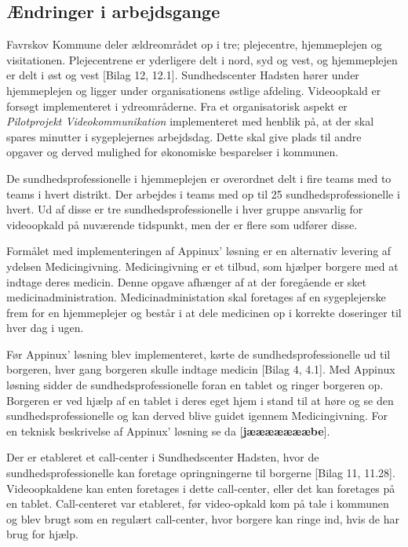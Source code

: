 \subsection{Ændringer i arbejdsgange}
Favrskov Kommune deler ældreområdet op i tre; plejecentre, hjemmeplejen og visitationen. Plejecentrene er yderligere delt i nord, syd og vest, og hjemmeplejen er delt i øst og vest [Bilag 12, 12.1]. Sundhedscenter Hadsten hører under hjemmeplejen og ligger under organisationens østlige afdeling. Videoopkald er forsøgt implementeret i ydreområderne. Fra et organisatorisk aspekt er \textit{Pilotprojekt Videokommunikation} implementeret med henblik på, at der skal spares minutter i sygeplejernes arbejdsdag. Dette skal give plads til andre opgaver og derved mulighed for økonomiske besparelser i kommunen. 

De sundhedsprofessionelle i hjemmeplejen er overordnet delt i fire teams med to teams i hvert distrikt. Der arbejdes i teams med op til 25 sundhedsprofessionelle i hvert. Ud af disse er tre sundhedsprofessionelle i hver gruppe ansvarlig for videoopkald på nuværende tidspunkt, men der er flere som udfører disse.  

Formålet med implementeringen af Appinux’ løsning er en alternativ levering af ydelsen Medicingivning. Medicingivning er et tilbud, som hjælper borgere med at indtage deres medicin. Denne opgave afhænger af at der foregående er sket medicinadministration. Medicinadministation skal foretages af en sygeplejerske frem for en hjemmeplejer og består i at dele medicinen op i korrekte doseringer til hver dag i ugen.

Før Appinux’ løsning blev implementeret, kørte de sundhedsprofessionelle ud til borgeren, hver gang borgeren skulle indtage medicin [Bilag 4, 4.1]. Med Appinux løsning sidder de sundhedsprofessionelle foran en tablet og ringer borgeren op. Borgeren er ved hjælp af en tablet i deres eget hjem i stand til at høre og se den sundhedsprofessionelle og kan derved blive guidet igennem Medicingivning. For en teknisk beskrivelse af Appinux' løsning se da [\textbf{jæææææææbe}].

Der er etableret et call-center i Sundhedscenter Hadsten, hvor de sundhedsprofessionelle kan foretage opringningerne til borgerne [Bilag 11, 11.28]. Videoopkaldene kan enten foretages i dette call-center, eller det kan foretages på en tablet. Call-centeret var etableret, før video-opkald kom på tale i kommunen og blev brugt som en regulært call-center, hvor borgere kan ringe ind, hvis de har brug for hjælp.


